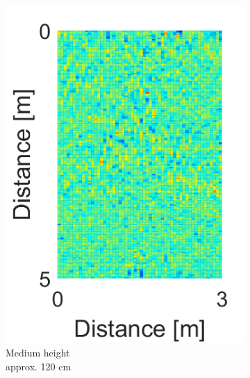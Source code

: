 \begin{figure}[H]
\begin{subfigure}[b]{0.29\textwidth}
\includegraphics[width=\textwidth]{figures/Norm_space_2.png}
\caption{Medium height \\ approx. 120 cm}
\label{Norm_medium}
\end{subfigure}
\begin{subfigure}[b]{0.29\textwidth}

\end{subfigure}
\end{figure}
